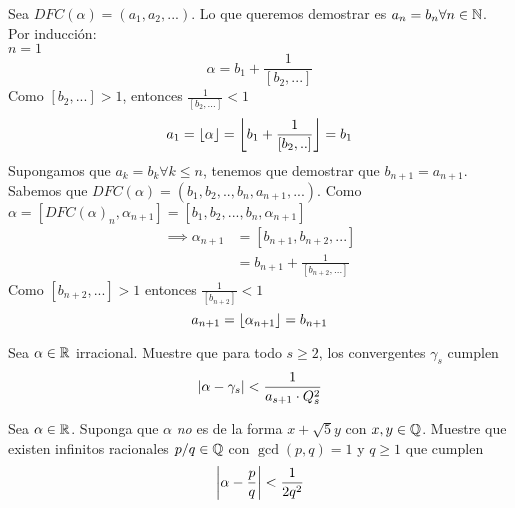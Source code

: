\begin{sol}
	Sea $DFC(\alpha)=(a_1,a_2,...)$. Lo que queremos demostrar es $a_n=b_n \forall n\in\mathbb{N}$.\\
	Por inducción:\\
	$n=1$
	\[\alpha=b_1+\frac{1}{[b_2,...]}\]
	Como $[b_2,...]>1$, entonces $\frac{1}{[b_2,...]}<1$
	\[a_1=\left\lfloor\alpha\right\rfloor=\left\lfloor b_1+\frac{1}{[b_2,..]}\right\rfloor=b_1\]
	Supongamos que $a_k=b_k\forall k\leq n$, tenemos que demostrar que $b_{n+1}=a_{n+1}$. Sabemos que $DFC(\alpha)=(b_1,b_2,..,b_n,a_{n+1},...)$. Como $\alpha=[DFC(\alpha)_n,\alpha_{n+1}]=[b_1,b_2,...,b_n,\alpha_{n+1}]$
	\begin{align*}
		\implies \alpha_{n+1} & =[b_{n+1},b_{n+2},...] \\
		                      & =b_{n+1}+\frac{1}{[b_{n+2},...]}
    \end{align*}
    Como $[b_{n+2},...]>1$ entonces $\frac{1}{[b_{n+2}]}<1$
    \begin{equation*}
        a_{n+1}=\left\lfloor\alpha_{n+1}\right\rfloor=b_{n+1}
    \end{equation*}
\end{sol}

\begin{prob}[5 pts.]
	Sea $\alpha\in\mathbb{R}$ irracional. Muestre que para todo $s\geq 2$, los convergentes $\gamma_s$ cumplen
	\[
		\left|\alpha-\gamma_s\right|<\frac{1}{a_{s+1}\cdot Q_s^2}
	\]
\end{prob}

\begin{sol}

\end{sol}

\begin{prob}[5 pts.]
	Sea $\alpha\in\mathbb{R}$. Suponga que $\alpha$ \textit{no} es de la forma $x+\sqrt{5}y$ con $x,y\in\mathbb{Q}$. Muestre que existen infinitos racionales $p/q\in\mathbb{Q}$ con $\gcd(p,q)=1$ y $q\geq 1$ que cumplen
	\[
		\left|\alpha-\frac{p}{q}\right|<\frac1{2q^2}
	\]
\end{prob}

